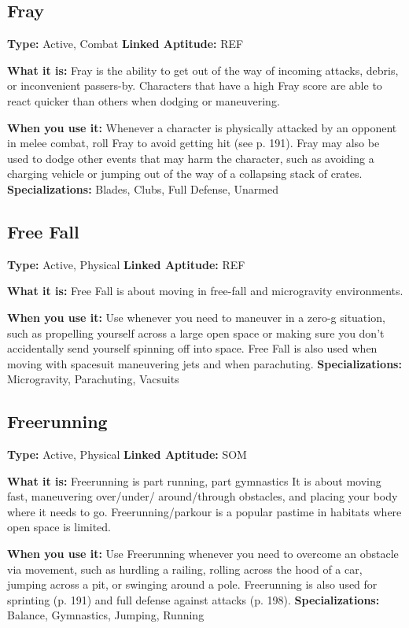 \subsection{Fray}

\textbf{Type:} Active, Combat
\textbf{Linked Aptitude:} REF

\textbf{What it is:} Fray is the ability to get out of the way 
of incoming attacks, debris, or inconvenient passers-by. 
Characters that have a high Fray score are able to react 
quicker than others when dodging or maneuvering.

\textbf{When you use it:} Whenever a character is physically 
attacked by an opponent in melee combat, roll Fray to 
avoid getting hit (see p. 191). Fray may also be used 
to dodge other events that may harm the character, 
such as avoiding a charging vehicle or jumping out of 
the way of a collapsing stack of crates.
\textbf{Specializations:} Blades, Clubs, Full Defense, Unarmed

\subsection{Free Fall}

\textbf{Type:} Active, Physical
\textbf{Linked Aptitude:} REF

\textbf{What it is:} Free Fall is about moving in free-fall and 
microgravity environments.

\textbf{When you use it:} Use whenever you need to maneuver
in a zero-g situation, such as propelling yourself
across a large open space or making sure you don't 
accidentally send yourself spinning off into space. 
Free Fall is also used when moving with spacesuit 
maneuvering jets and when parachuting.
\textbf{Specializations:} Microgravity, Parachuting, Vacsuits

\subsection{Freerunning}

\textbf{Type:} Active, Physical
\textbf{Linked Aptitude:} SOM

\textbf{What it is:} Freerunning is part running, part gymnastics
It is about moving fast, maneuvering over/under/
around/through obstacles, and placing your body 
where it needs to go. Freerunning/parkour is a popular 
pastime in habitats where open space is limited.

\textbf{When you use it:} Use Freerunning whenever you 
need to overcome an obstacle via movement, such 
as hurdling a railing, rolling across the hood of a 
car, jumping across a pit, or swinging around a pole. 
Freerunning is also used for sprinting (p. 191) and full 
defense against attacks (p. 198).
\textbf{Specializations:} Balance, Gymnastics, Jumping, Running

